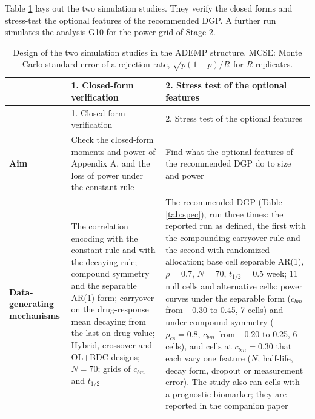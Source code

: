 \documentclass[
  11pt,
]{article}
\begin{document}
Table \ref{tab:ademp} lays out the two simulation studies. They
verify the closed forms and stress-test the optional features of the
recommended DGP. A further run simulates the analysis G10 for the
power grid of Stage 2.

\begin{longtable}[]{@{}
  >{\raggedright\arraybackslash}p{}
  >{\raggedright\arraybackslash}p{}
  >{\raggedright\arraybackslash}p{}@{}}
\caption{\label{tab:ademp} Design of the two simulation studies in the
ADEMP structure. MCSE: Monte Carlo standard error of a rejection rate,
\(\sqrt{p(1-p)/R}\) for \(R\) replicates.}\tabularnewline
\toprule\noalign{}
\begin{minipage}[b]{\linewidth}\raggedright
\end{minipage} & \begin{minipage}[b]{\linewidth}\raggedright
1. Closed-form verification
\end{minipage} & \begin{minipage}[b]{\linewidth}\raggedright
2. Stress test of the optional features
\end{minipage} \\
\midrule\noalign{}
\endfirsthead
\toprule\noalign{}
\begin{minipage}[b]{\linewidth}\raggedright
\end{minipage} & \begin{minipage}[b]{\linewidth}\raggedright
1. Closed-form verification
\end{minipage} & \begin{minipage}[b]{\linewidth}\raggedright
2. Stress test of the optional features
\end{minipage} \\
\midrule\noalign{}
\endhead
\bottomrule\noalign{}
\endlastfoot
\textbf{Aim} & Check the closed-form moments and power of Appendix A, and the loss of power under the constant rule & Find what the optional features of the recommended DGP do to size and power \\
\textbf{Data-generating mechanisms} & The correlation encoding with the constant rule and with the decaying rule; compound symmetry and the separable AR(1) form; carryover on the drug-response mean decaying from the last on-drug value; Hybrid, crossover and OL+BDC designs; \(N = 70\); grids of \(c_{bm}\) and \(t_{1/2}\) & The recommended DGP (Table \ref{tab:spec}), run three times: the reported run as defined, the first with the compounding carryover rule and the second with randomized allocation; base cell separable AR(1), \(\rho = 0.7\), \(N = 70\), \(t_{1/2} = 0.5\) week; 11 null cells and alternative cells: power curves under the separable form (\(c_{bm}\) from \(-0.30\) to 0.45, 7 cells) and under compound symmetry (\(\rho_{cs} = 0.8\), \(c_{bm}\) from \(-0.20\) to 0.25, 6 cells), and cells at \(c_{bm} = 0.30\) that each vary one feature (\(N\), half-life, decay form, dropout or measurement error). The study also ran cells with a prognostic biomarker; they are reported in the companion paper \\

\end{longtable}
\end{document}
